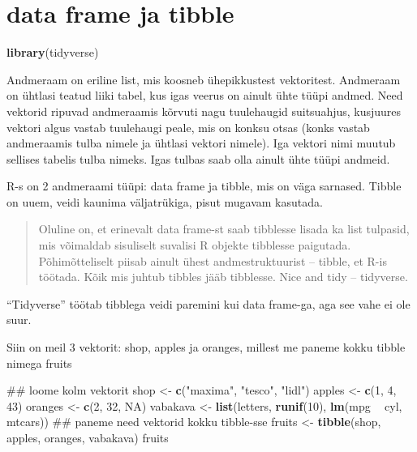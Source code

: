 \documentclass[]{book}
\newenvironment{Shaded}{\begin{snugshade}}{\end{snugshade}}
\newcommand{\KeywordTok}[1]{\textcolor[rgb]{0.13,0.29,0.53}{\textbf{#1}}}
\newcommand{\DecValTok}[1]{\textcolor[rgb]{0.00,0.00,0.81}{#1}}
\newcommand{\StringTok}[1]{\textcolor[rgb]{0.31,0.60,0.02}{#1}}
\newcommand{\OtherTok}[1]{\textcolor[rgb]{0.56,0.35,0.01}{#1}}
\newcommand{\OperatorTok}[1]{\textcolor[rgb]{0.81,0.36,0.00}{\textbf{#1}}}
\newcommand{\NormalTok}[1]{#1}
\begin{document}
\section{data frame ja tibble}\label{data-frame-ja-tibble}

\begin{Shaded}
\begin{Highlighting}[]
\KeywordTok{library}\NormalTok{(tidyverse)}
\end{Highlighting}
\end{Shaded}

Andmeraam on eriline list, mis koosneb ühepikkustest vektoritest.
Andmeraam on ühtlasi teatud liiki tabel, kus igas veerus on ainult ühte
tüüpi andmed. Need vektorid ripuvad andmeraamis kõrvuti nagu tuulehaugid
suitsuahjus, kusjuures vektori algus vastab tuulehaugi peale, mis on
konksu otsas (konks vastab andmeraamis tulba nimele ja ühtlasi vektori
nimele). Iga vektori nimi muutub sellises tabelis tulba nimeks. Igas
tulbas saab olla ainult ühte tüüpi andmeid.

R-s on 2 andmeraami tüüpi: data frame ja tibble, mis on väga sarnased.
Tibble on uuem, veidi kaunima väljatrükiga, pisut mugavam kasutada.

\begin{quote}
Oluline on, et erinevalt data frame-st saab tibblesse lisada ka list
tulpasid, mis võimaldab sisuliselt suvalisi R objekte tibblesse
paigutada. Põhimõtteliselt piisab ainult ühest andmestruktuurist --
tibble, et R-is töötada. Kõik mis juhtub tibbles jääb tibblesse. Nice
and tidy -- tidyverse.
\end{quote}

``Tidyverse'' töötab tibblega veidi paremini kui data frame-ga, aga see
vahe ei ole suur.

Siin on meil 3 vektorit: shop, apples ja oranges, millest me paneme
kokku tibble nimega fruits

\begin{Shaded}
\begin{Highlighting}[]
\NormalTok{## loome kolm vektorit}
\NormalTok{shop <-}\StringTok{ }\KeywordTok{c}\NormalTok{(}\StringTok{"maxima"}\NormalTok{, }\StringTok{"tesco"}\NormalTok{, }\StringTok{"lidl"}\NormalTok{)}
\NormalTok{apples <-}\StringTok{ }\KeywordTok{c}\NormalTok{(}\DecValTok{1}\NormalTok{, }\DecValTok{4}\NormalTok{, }\DecValTok{43}\NormalTok{)}
\NormalTok{oranges <-}\StringTok{ }\KeywordTok{c}\NormalTok{(}\DecValTok{2}\NormalTok{, }\DecValTok{32}\NormalTok{, }\OtherTok{NA}\NormalTok{)}
\NormalTok{vabakava <-}\StringTok{ }\KeywordTok{list}\NormalTok{(letters, }\KeywordTok{runif}\NormalTok{(}\DecValTok{10}\NormalTok{), }\KeywordTok{lm}\NormalTok{(mpg }\OperatorTok{~}\StringTok{ }\NormalTok{cyl, mtcars))}
\NormalTok{## paneme need vektorid kokku tibble-sse}
\NormalTok{fruits <-}\StringTok{ }\KeywordTok{tibble}\NormalTok{(shop, apples, oranges, vabakava)}
\NormalTok{fruits}
\end{Highlighting}
\end{Shaded}
\end{document}
